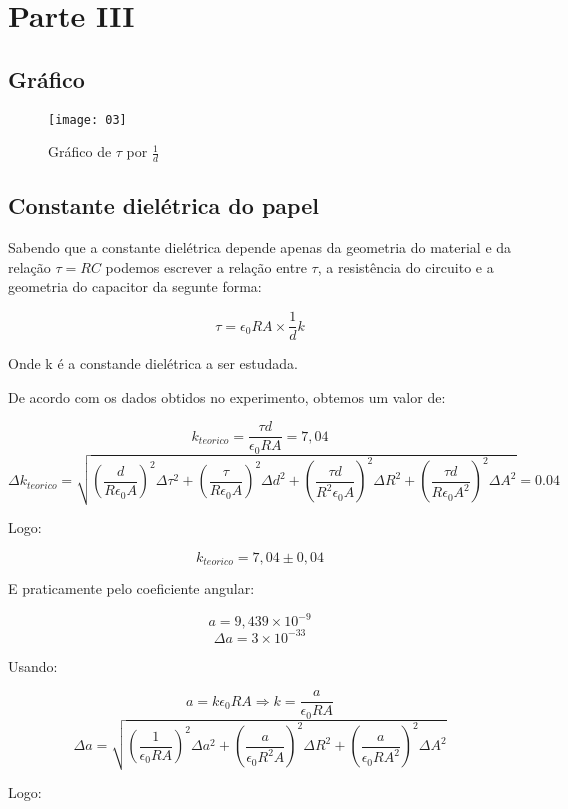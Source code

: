 \section{Parte III}
    \subsection{Gráfico}
        \begin{figure} [H] 
            \texttt{[image: 03]}
            \caption{Gráfico de $\tau$ por $\frac{1}{d}$}
            \label{fig:03}
        \end{figure}

    \subsection{Constante dielétrica do papel}
        Sabendo que a constante dielétrica depende apenas da geometria do 
        material e da relação $\tau = RC$ podemos escrever a relação entre $\tau$,
        a resistência do circuito e a geometria do capacitor da segunte forma:

        $$\tau = \epsilon_0 R A \times \frac{1}{d} k$$

        Onde k é a constande dielétrica a ser estudada.
        
        De acordo com os dados obtidos no experimento, obtemos um valor de:

        $$k_{teorico} = \frac{\tau d}{\epsilon_0 R A} = 7,04$$
        $$\Delta k_{teorico} = 
        \sqrt{(\frac{d}{R \epsilon_0 A})^2 \Delta\tau^2 + 
        (\frac{\tau}{R \epsilon_0 A})^2 \Delta d^2 + 
        (\frac{\tau d}{R^2 \epsilon_0 A})^2 \Delta R^2 + 
        (\frac{\tau d}{R \epsilon_0 A^2})^2 \Delta A^2} = 0.04$$

        Logo:

        $$k_{teorico} = 7,04 \pm 0,04$$

        E praticamente pelo coeficiente angular:

        $$a = 9,439\times10^{-9}$$
        $$\Delta a = 3\times10^{-33}$$

        Usando:

        $$a = k\epsilon_0 R A 
        \Rightarrow k = \frac{a}{\epsilon_0 R A}$$
        $$\Delta a = \sqrt{
            (\frac{1}{\epsilon_0 R A})^2 \Delta a^2 +
            (\frac{a}{\epsilon_0 R^2 A})^2 \Delta R^2 +
            (\frac{a}{\epsilon_0 R A^2})^2 \Delta A^2
        }$$

        Logo:

